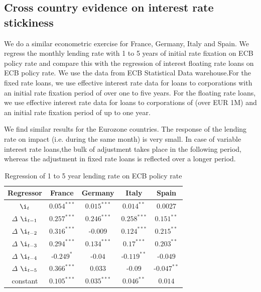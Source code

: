 \documentclass[12pt]{article}
\numberwithin{equation}{section}
\begin{document}
\begin{appendix}
\FloatBarrier

\section{Cross country evidence on interest rate stickiness}
\label{app_crossCountry}
We do a similar econometric exercise for France, Germany, Italy and Spain. We regress the monthly lending rate with 1 to 5 years of initial rate fixation on ECB policy rate and compare this with the regression of interest floating rate loans on ECB policy rate. We use the data from ECB Statistical Data warehouse.For the fixed rate loans, we use effective interest rate data for loans to corporations with an initial rate fixation  period of over one  to five years. For the floating rate loans, we use effective interest rate data for loans to corporations of (over EUR 1M) and an initial rate fixation period of up to one year.

We find similar results for the Eurozone countries. The response of the lending rate on impact (i.e. during the same month) is very small. In case of variable interest rate loans,the bulk of adjustment takes place in the following period, whereas the adjustment in fixed rate loans is reflected over a longer period.
 
\begin {table}[H]
\caption {Regression of 1 to 5 year lending rate on ECB policy rate} \label{tab:title} 
\begin{center}
	\begin{tabular}{||c c c c c||} 
		\hline
		Regressor &  France & Germany& Italy & Spain \\ [0.5ex] 
		\hline\hline
		$\i_{t}$ & $0.054^{***}$& $0.015^{***}$ & $0.014^{**}$& $0.0027$ \\ 
		\hline
		$\Delta$ $\i_{t-1}$& $0.257^{***}$& $0.246^{***}$& $0.258^{***}$& $0.151^{**}$ \\ 
		\hline
		$\Delta$ $\i_{t-2}$&$0.316^{***}$ &-$0.009$& $0.124^{***}$& $0.215^{**}$ \\
		
		\hline
		$\Delta$ $\i_{t-3}$	&  $0.294^{***}$ &  $0.134^{***}$& $0.17^{***}$& $0.203^{**}$ \\
		\hline
		$\Delta$  $\i_{t-4}$&-$0.249^{*}$&-$0.04$ & -$0.119^{**}$& -$0.049$ \\  
		\hline
		$\Delta$  $\i_{t-5}$&$0.366^{***}$&$0.033$ & -$0.09$& -$0.047^{**}$ \\  
		\hline
		constant&$0.105^{***}$ &$0.035^{***}$& $0.046^{**}$ & $0.014$\\ 
		

\end{tabular}
\end{center}
\end{table}
\end{appendix}
\end{document}
